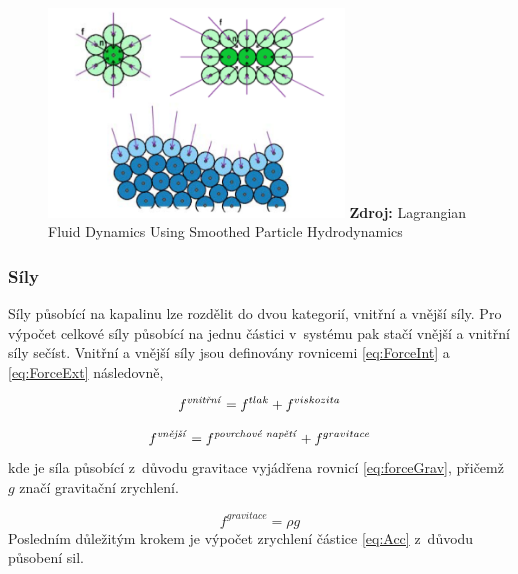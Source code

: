 \begin{figure}[hbt]
	\centering
	\captionsetup{justification=centering}
	\includegraphics[width=0.7\textwidth]{obrazky-figures/SurfTens.png}
	\textbf{Zdroj: } Lagrangian Fluid Dynamics Using Smoothed Particle Hydrodynamics \cite{KelagerSPH}
	\label{fig:SurTen}
\end{figure}

\subsubsection{Síly}
Síly působící na kapalinu lze rozdělit do dvou kategorií, vnitřní a vnější síly. Pro výpočet celkové síly působící na jednu částici v~systému pak stačí vnější a vnitřní síly sečíst. Vnitřní a vnější síly jsou definovány rovnicemi \ref{eq:ForceInt} a \ref{eq:ForceExt} následovně, \cite{KelagerSPH}

\begin{equation}
	f^{\text{\textit{vnitřní}}} = f^{tlak} + f^{viskozita}
	\label{eq:ForceInt}
\end{equation}

\begin{equation}
	f^{\text{\textit{vnější}}} = f^{\text{\textit{povrchové napětí}}} + f^{gravitace}
	\label{eq:ForceExt}
\end{equation}
kde je síla působící z~důvodu gravitace vyjádřena rovnicí \ref{eq:forceGrav}, přičemž $g$ značí gravitační zrychlení.

\begin{equation}
	f^{gravitace} = \rho g
	\label{eq:forceGrav}
\end{equation}
Posledním důležitým krokem je výpočet zrychlení částice \ref{eq:Acc} z~důvodu působení sil.

